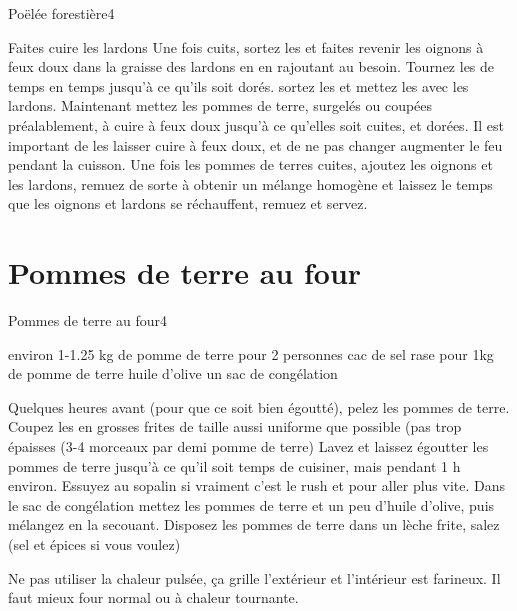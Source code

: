 {\begin{recette}{Poëlée forestière}{4}{}{}
\begin{preparation}
\etape Faites cuire les lardons
\etape Une fois cuits, sortez les et faites revenir les oignons à feux doux dans la graisse des lardons en en rajoutant au 
besoin. Tournez les de temps en temps jusqu'à ce qu'ils soit dorés.
\etape sortez les et mettez les avec les lardons. Maintenant mettez les pommes de terre, surgelés ou coupées préalablement, à 
cuire à feux doux jusqu'à ce qu'elles soit cuites, et dorées. Il est important de les laisser cuire à feux doux, et de ne pas 
changer augmenter le feu pendant la cuisson.
\etape Une fois les pommes de terres cuites, ajoutez les oignons et les lardons, remuez de sorte à obtenir un mélange homogène 
et laissez le temps que les oignons et lardons se réchauffent, remuez et servez.
\end{preparation}
\end{recette}

\section{Pommes de terre au four}
\begin{recette}{Pommes de terre au four}{4}{}{}\label{sec:pomme-de-terre-four}
\begin{ingredients}
\ingredient environ 1-1.25 kg de pomme de terre pour 2 personnes
 cac de sel rase pour 1kg de pomme de terre 
\ingredient huile d'olive
\ingredient un sac de congélation
\end{ingredients}

\begin{preparation}
\etape Quelques heures avant (pour que ce soit bien égoutté), pelez les pommes de terre. Coupez les en grosses frites de taille aussi uniforme que possible (pas trop épaisses (3-4 morceaux par demi pomme de terre)
\etape Lavez et laissez égoutter les pommes de terre jusqu'à ce qu'il soit temps de cuisiner, mais pendant 1 h environ. Essuyez au sopalin si vraiment c'est le rush et pour aller plus vite.
\etape Dans le sac de congélation mettez les pommes de terre et un peu d'huile d'olive, puis mélangez en la secouant.
\etape Disposez les pommes de terre dans un lèche frite, salez (sel et épices si vous voulez)
\end{preparation}

\begin{remarque}
Ne pas utiliser la chaleur pulsée, ça grille l'extérieur et l'intérieur est farineux. Il faut mieux four normal ou à chaleur tournante. 
\end{remarque}


\end{recette}}
